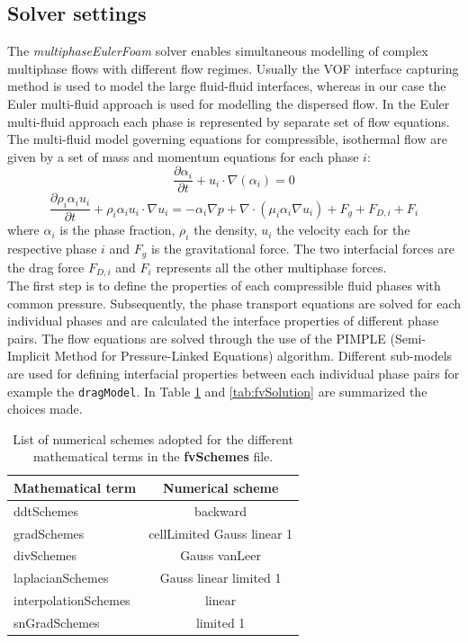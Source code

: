 \documentclass[11pt,a4paper]{article}
\begin{document}
\subsection{Solver settings}
\label{sub:solver}
The \textit{multiphaseEulerFoam} solver enables simultaneous modelling of complex multiphase flows with different flow regimes. Usually the VOF interface capturing method is used to model the large fluid-fluid interfaces, whereas in our case the Euler multi-fluid approach is used for modelling the dispersed flow. In the Euler multi-fluid approach each phase is represented by separate set of flow equations. 
The multi-fluid model governing equations for compressible, isothermal flow are given by a set of mass and momentum equations for each phase $i$:
\begin{equation}
    \frac{\partial \alpha_i}{\partial t}+u_i\cdot \nabla (\alpha_i)=0
\end{equation}
\begin{equation}
    \frac{\partial \rho_i\alpha_iu_i}{\partial t}+\rho_i\alpha_iu_i\cdot \nabla u_i=-\alpha_i\nabla p+\nabla \cdot (\mu_i\alpha_i\nabla u_i)+F_g+F_{D,i}+F_{i}
\end{equation}
where $\alpha_i$ is the phase fraction, $\rho_i$ the density, $u_i$ the velocity each for the respective phase $i$ and $F_g$ is the gravitational force. The two interfacial forces are the drag force $F_{D,i}$ and $F_{i}$ represents all the other multiphase forces. \\
The first step is to define the properties of each compressible fluid phases with common pressure. Subsequently, the phase transport equations are solved for each individual phases and are calculated the interface properties of different phase pairs. The flow equations are solved through the use of the PIMPLE (Semi-Implicit Method for Pressure-Linked Equations) algorithm. Different sub-models are used for defining interfacial properties between each individual phase pairs for example the \texttt{dragModel}. In Table \ref{tab:fvSchemes} and \ref{tab:fvSolution} are summarized the choices made. 
\begin{table}[H]
  \centering
    \begin{tabular}{|p{10em} c|}
    \hline
    \rowcolor{bluePoli!40}
    \textbf{Mathematical term} & \textbf{Numerical scheme}\\
     \hline \hline
    ddtSchemes & backward\\
    gradSchemes & cellLimited Gauss linear 1\\
    divSchemes & Gauss vanLeer\\
    laplacianSchemes & Gauss linear limited 1\\
    interpolationSchemes & linear\\
    snGradSchemes & limited 1\\
    \hline
    \end{tabular}%
  \caption{List of numerical schemes adopted for the different mathematical terms in the \textbf{fvSchemes} file.}
  \label{tab:fvSchemes}%
\end{table}%
\end{document}
